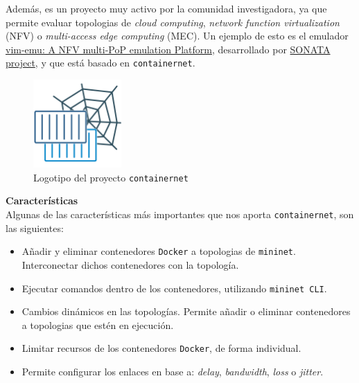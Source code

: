 \documentclass[a4paper, oneside, 12pt]{book}
\begin{document}
	\noindent Además, es un proyecto muy activo por la comunidad investigadora, ya que permite evaluar topologias de \textit{cloud computing}, \textit{network function virtualization} (NFV) o \textit{multi-access edge computing} (MEC). Un ejemplo de esto es el emulador \href{https://github.com/containernet/vim-emu}{vim-emu: A NFV multi-PoP emulation Platform}, desarrollado por \href{https://www.sonata-nfv.eu/}{SONATA project}, y que está basado en \texttt{containernet}.
	
	\begin{figure}[h!]
		\begin{center}
			\includegraphics[width=0.3\textwidth]{img/containernet_logo.png}
			\caption{Logotipo del proyecto \texttt{containernet}}	
			\label{img: containernet logo}
		\end{center}
	\end{figure}

	\vspace{10px}
	
	\noindent \textbf{\large Características}\\
	
	\noindent Algunas de las características más importantes que nos aporta \texttt{containernet}, son las siguientes:
	
	\begin{itemize}
		\item Añadir y eliminar contenedores \texttt{Docker} a topologias de \texttt{mininet}. Interconectar dichos contenedores con la topología.
		
		\item Ejecutar comandos dentro de los contenedores, utilizando \texttt{mininet CLI}.
		
		\item Cambios dinámicos en las topologías. Permite añadir o eliminar contenedores a topologias que estén en ejecución.
		
		\item Limitar recursos de los contenedores \texttt{Docker}, de forma individual.
		
		\item Permite configurar los enlaces en base a: \textit{delay}, \textit{bandwidth}, \textit{loss} o \textit{jitter}.
	\end{itemize}
	
\end{document}
